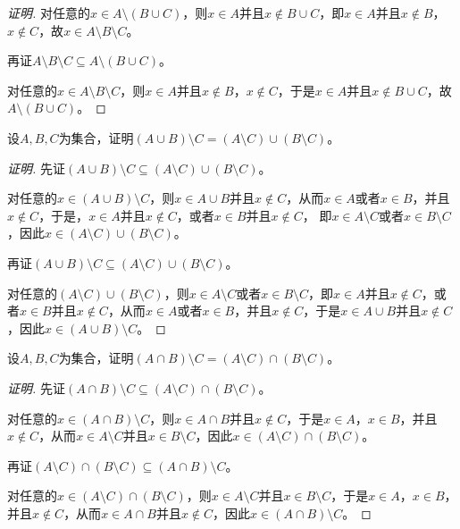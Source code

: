 \documentclass{article}
\begin{document}
\begin{CJK}{UTF8}{gbsn}
\begin{proof}[证明]
  对任意的$x\in A\setminus (B\cup C)$，则$x\in A$并且$x\notin B\cup C$，即$x\in A$并且$x\notin B$，$x\notin C$，故$x\in A\setminus B \setminus C$。
  
  再证$A\setminus B \setminus C\subseteq A\setminus (B\cup C) $。

  对任意的$x\in A\setminus B \setminus C$，则$x\in A$并且$x\notin B$，$x\notin C$，于是$x\in A$并且$x\notin B\cup C$，故$A\setminus (B\cup C)$。

\end{proof}
\begin{Exercise}
  设$A,B,C$为集合，证明$(A\cup B)\setminus C = (A\setminus C) \cup (B\setminus C)$。
\end{Exercise}
\begin{proof}[证明]
  先证$(A\cup B)\setminus C \subseteq (A\setminus C) \cup (B\setminus C)$。

  对任意的$x\in (A\cup B)\setminus C$，则$x\in A\cup B$并且$x\notin C$，从而$x\in A$或者$x\in B$，并且$x\notin C$，于是，$x\in A$并且$x\notin C$，或者$x\in B$并且$x\notin C$，
  即$x\in A\setminus C$或者$x\in B\setminus C$，因此$x\in (A\setminus C) \cup (B\setminus C)$。

  再证$(A\cup B)\setminus C \subseteq (A\setminus C) \cup (B\setminus C)$。

  对任意的$(A\setminus C) \cup (B\setminus C)$，则$x\in A\setminus C$或者$x\in B\setminus C$，即$x\in A$并且$x\notin C$，或者$x\in B$并且$x\notin C$，从而$x\in A$或者$x\in B$，并且$x\notin C$，于是$x\in A\cup B$并且$x\notin C$，因此$x\in (A\cup B)\setminus C$。
\end{proof}
\begin{Exercise}
  设$A,B,C$为集合，证明$(A\cap B)\setminus C = (A\setminus C) \cap (B\setminus C)$。
\end{Exercise}
\begin{proof}[证明]
  先证$(A\cap B)\setminus C \subseteq (A\setminus C) \cap (B\setminus C)$。

对任意的$x\in (A\cap B)\setminus C$，则$x\in A\cap B$并且$x\notin C$，于是$x\in A$，$x\in B$，并且$x\notin C$，从而$x\in A\setminus C$并且$x\in B\setminus C$，因此$x\in (A\setminus C) \cap (B\setminus C)$。


  再证$(A\setminus C) \cap (B\setminus C) \subseteq (A\cap B)\setminus C$。

  对任意的$x\in (A\setminus C) \cap (B\setminus C)$，则$x\in A\setminus C$并且$x\in B\setminus C$，于是$x\in A$，$x\in B$，并且$x\notin C$，从而$x\in A\cap B$并且$x\notin C$，因此$x\in (A\cap B)\setminus C$。


\end{proof}
\end{CJK}
\end{document}
